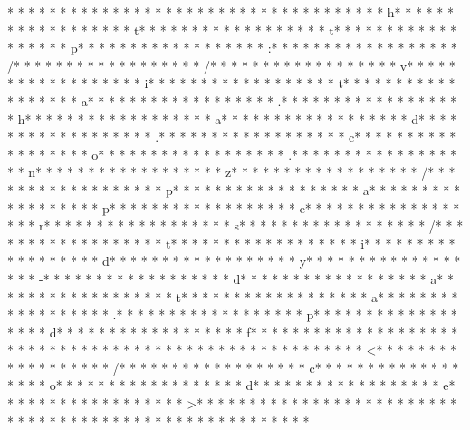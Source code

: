 * * *  * * *  * * *  *  * * *  *  * * *  * 	* * *  * * *  * * *  *  * * *  *  * * *  * h* * *  * * *  * * *  *  * * *  *  * * *  * t* * *  * * *  * * *  *  * * *  *  * * *  * t* * *  * * *  * * *  *  * * *  *  * * *  * p* * *  * * *  * * *  *  * * *  *  * * *  * :* * *  * * *  * * *  *  * * *  *  * * *  * /* * *  * * *  * * *  *  * * *  *  * * *  * /* * *  * * *  * * *  *  * * *  *  * * *  * v* * *  * * *  * * *  *  * * *  *  * * *  * i* * *  * * *  * * *  *  * * *  *  * * *  * t* * *  * * *  * * *  *  * * *  *  * * *  * a* * *  * * *  * * *  *  * * *  *  * * *  * .* * *  * * *  * * *  *  * * *  *  * * *  * h* * *  * * *  * * *  *  * * *  *  * * *  * a* * *  * * *  * * *  *  * * *  *  * * *  * d* * *  * * *  * * *  *  * * *  *  * * *  * .* * *  * * *  * * *  *  * * *  *  * * *  * c* * *  * * *  * * *  *  * * *  *  * * *  * o* * *  * * *  * * *  *  * * *  *  * * *  * .* * *  * * *  * * *  *  * * *  *  * * *  * n* * *  * * *  * * *  *  * * *  *  * * *  * z* * *  * * *  * * *  *  * * *  *  * * *  * /* * *  * * *  * * *  *  * * *  *  * * *  * p* * *  * * *  * * *  *  * * *  *  * * *  * a* * *  * * *  * * *  *  * * *  *  * * *  * p* * *  * * *  * * *  *  * * *  *  * * *  * e* * *  * * *  * * *  *  * * *  *  * * *  * r* * *  * * *  * * *  *  * * *  *  * * *  * s* * *  * * *  * * *  *  * * *  *  * * *  * /* * *  * * *  * * *  *  * * *  *  * * *  * t* * *  * * *  * * *  *  * * *  *  * * *  * i* * *  * * *  * * *  *  * * *  *  * * *  * d* * *  * * *  * * *  *  * * *  *  * * *  * y* * *  * * *  * * *  *  * * *  *  * * *  * -* * *  * * *  * * *  *  * * *  *  * * *  * d* * *  * * *  * * *  *  * * *  *  * * *  * a* * *  * * *  * * *  *  * * *  *  * * *  * t* * *  * * *  * * *  *  * * *  *  * * *  * a* * *  * * *  * * *  *  * * *  *  * * *  * .* * *  * * *  * * *  *  * * *  *  * * *  * p* * *  * * *  * * *  *  * * *  *  * * *  * d* * *  * * *  * * *  *  * * *  *  * * *  * f* * *  * * *  * * *  *  * * *  *  * * *  * 
* * *  * * *  * * *  *  * * *  *  * * *  * 	* * *  * * *  * * *  *  * * *  *  * * *  * <* * *  * * *  * * *  *  * * *  *  * * *  * /* * *  * * *  * * *  *  * * *  *  * * *  * c* * *  * * *  * * *  *  * * *  *  * * *  * o* * *  * * *  * * *  *  * * *  *  * * *  * d* * *  * * *  * * *  *  * * *  *  * * *  * e* * *  * * *  * * *  *  * * *  *  * * *  * >* * *  * * *  * * *  *  * * *  *  * * *  * 
* * *  * * *  * * *  *  * * *  *  * * *  * 	* * *  * * *  * * *  *  * * *  *  * * *  * 
